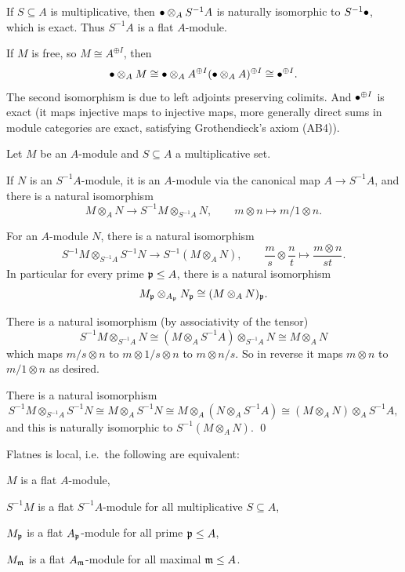 \enote

\bexam

    If $S\subseteq A$ is multiplicative, then $\bullet\otimes_AS^{-1}A$ is naturally isomorphic to $S^{-1}\bullet$, which is exact.
    Thus $S^{-1}A$ is a flat $A$-module.

    If $M$ is free, so $M\cong A^{\oplus I}$, then
    $$ \bullet\otimes_AM \cong \bullet\otimes_AA^{\oplus I} (\bullet\otimes_AA)^{\oplus I} \cong \bullet^{\oplus I} . $$
    The second isomorphism is due to left adjoints preserving colimits.
    And $\bullet^{\oplus I}$ is exact (it maps injective maps to injective maps, more generally direct sums in module categories are exact,
    satisfying Grothendieck's axiom (AB4)).

\eexam

\blemm

    Let $M$ be an $A$-module and $S\subseteq A$ a multiplicative set.
    \benum
        \item If $N$ is an $S^{-1}A$-module, it is an $A$-module via the canonical map $A\to S^{-1}A$, and there is a natural isomorphism
        $$ M\otimes_AN \to S^{-1}M\otimes_{S^{-1}A}N,\qquad m\otimes n\mapsto m/1\otimes n . $$
        \item For an $A$-module $N$, there is a natural isomorphism
        $$ S^{-1}M\otimes_{S^{-1}A}S^{-1}N \to S^{-1}(M\otimes_AN),\qquad \frac ms\otimes\frac nt \mapsto \frac{m\otimes n}{st} . $$
        In particular for every prime ${{\frak p}}\leq A$, there is a natural isomorphism
        $$ M_{{\frak p}} \otimes_{A_{{\frak p}}} N_{{\frak p}} \cong (M\otimes_AN)_{{\frak p}} . $$
    \eenum

\elemm

\bproof

    There is a natural isomorphism (by associativity of the tensor)
    $$ S^{-1}M\otimes_{S^{-1}A}N \cong (M\otimes_AS^{-1}A)\otimes_{S^{-1}A}N \cong M\otimes_AN $$
    which maps $m/s\otimes n$ to $m\otimes 1/s\otimes n$ to $m\otimes n/s$.
    So in reverse it maps $m\otimes n$ to $m/1\otimes n$ as desired.

    There is a natural isomorphism
    $$ S^{-1}M\otimes_{S^{-1}A}S^{-1}N \cong M\otimes_AS^{-1}N \cong M\otimes_A(N\otimes_AS^{-1}A) \cong (M\otimes_AN)\otimes_A S^{-1}A , $$
    and this is naturally isomorphic to $S^{-1}(M\otimes_AN)$.
    \qed

\eproof

\bcoro

    Flatnes is local, i.e.\ the following are equivalent:
    \benum
        \item $M$ is a flat $A$-module,
        \item $S^{-1}M$ is a flat $S^{-1}A$-module for all multiplicative $S\subseteq A$,
        \item $M_{{\frak p}}$ is a flat $A_{{\frak p}}$-module for all prime ${{\frak p}}\leq A$,
        \item $M_{{\frak m}}$ is a flat $A_{{\frak m}}$-module for all maximal ${{\frak m}}\leq A$.
    \eenum

